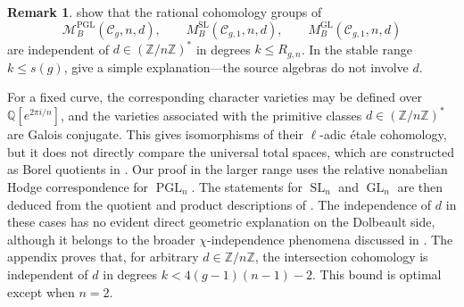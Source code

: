 \documentclass[11pt,reqno]{amsart}
\theoremstyle{plain} %
\theoremstyle{definition}
\newtheorem{remark}[theorem]{Remark}
\newcommand{\QQ}{\mathbb{Q}}
\newcommand{\M}{\mathcal{M}}
\newcommand{\C}{\mathcal{C}}
\newcommand{\ZZ}{\mathbb{Z}}
\DeclareMathOperator{\GL}{GL}
\DeclareMathOperator{\SL}{SL}
\DeclareMathOperator{\PGL}{PGL}
\begin{document}
\begin{remark}
 show that the rational cohomology groups of
\[
\M_B^{\PGL}(\C_g,n,d), \qquad
M_B^{\SL}(\C_{g,1},n,d), \qquad
M_B^{\GL}(\C_{g,1},n,d)
\]
are independent of $d\in(\ZZ/n\ZZ)^*$ in degrees $k\leq R_{g,n}$. In the stable range $k\leq s(g)$,  give a simple explanation---the source algebras do not involve $d$.

For a fixed curve, the corresponding character varieties may be defined over $\QQ[e^{2\pi i/n}]$, and the varieties associated with the primitive classes $d\in(\ZZ/n\ZZ)^*$ are Galois conjugate. This gives isomorphisms of their $\ell$-adic étale cohomology, but it does not directly compare the universal total spaces, which are constructed as Borel quotients in . Our proof in the larger range uses the relative nonabelian Hodge correspondence for $\PGL_n$. The statements for $\SL_n$ and $\GL_n$ are then deduced from the quotient and product descriptions of . The independence of $d$ in these cases has no evident direct geometric explanation on the Dolbeault side, although it belongs to the broader $\chi$-independence phenomena discussed in \cite[\S 0.3]{chi-indep}. The appendix proves that, for arbitrary $d\in\ZZ/n\ZZ$, the intersection cohomology is independent of $d$ in degrees $k<4(g-1)(n-1)-2$. This bound is optimal except when $n=2$.
\end{remark}
\end{document}
